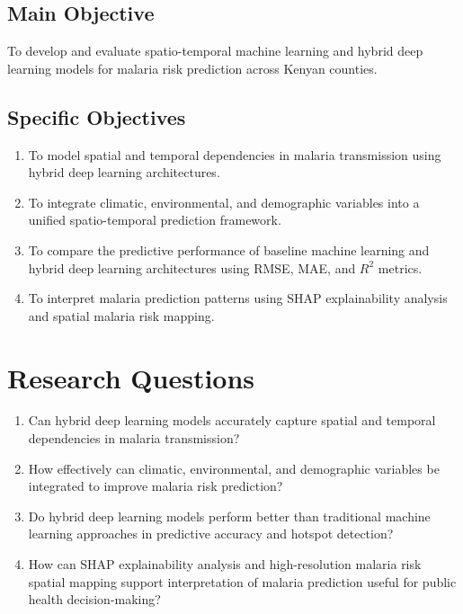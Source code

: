 \subsection{Main Objective}
To develop and evaluate spatio-temporal machine learning and hybrid deep learning models for malaria risk prediction across Kenyan counties.
\subsection{Specific Objectives}

\begin{enumerate}
	\item To model spatial and temporal dependencies in malaria transmission using hybrid deep learning architectures.
	\item To integrate climatic, environmental, and demographic variables into a unified spatio-temporal prediction framework.
	\item To compare the predictive performance of baseline machine learning and hybrid deep learning architectures using RMSE, MAE, and $R^2$
	metrics.
	\item To interpret malaria prediction patterns using SHAP explainability analysis and spatial malaria risk mapping.
\end{enumerate}

\section{Research Questions}

\begin{enumerate}
	\item Can hybrid deep learning models accurately capture spatial and temporal dependencies in malaria transmission?
	\item How effectively can climatic, environmental, and demographic variables be integrated to improve malaria risk prediction?
	\item Do hybrid deep learning models  perform better than traditional machine learning approaches in predictive accuracy and hotspot detection?
	\item How can SHAP explainability analysis and high-resolution malaria risk  spatial mapping support interpretation of malaria prediction useful for public health decision-making?
\end{enumerate}
